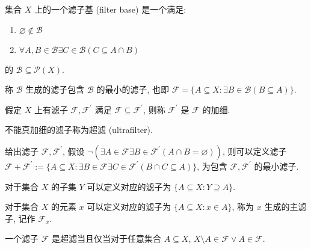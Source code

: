 \begin{definition}[滤子基]
    集合 \(X\) 上的一个滤子基 (filter base) 是一个满足:

    \begin{enumerate}
        \item \(\varnothing \notin \mathcal{B}\)
        \item \(\forall A,B \in \mathcal{B} \exists C \in \mathcal{B} (C \subseteq A \cap B)\)
    \end{enumerate}

    的 \(\mathcal{B} \subseteq \mathcal{P} (X)\).

    称 \(\mathcal{B}\) 生成的滤子包含 \(\mathcal{B}\) 的最小的滤子, 也即 \(\mathcal{F} = \{A \subseteq X : \exists B \in \mathcal{B} (B \subseteq A)\}\).
\end{definition}

\begin{definition}[加细]
    假定 \(X\) 上有滤子 \(\mathcal{F},\mathcal{F}^\prime\) 满足 \(\mathcal{F} \subseteq \mathcal{F}^\prime\), 则称 \(\mathcal{F}^\prime\) 是 \(\mathcal{F}\) 的加细. 
\end{definition}

\begin{definition}[超滤]
    不能真加细的滤子称为超滤 (ultrafilter).
\end{definition}

\begin{definition}
    给出滤子 \(\mathcal{F},\mathcal{F}^\prime\), 假设 \(\neg (\exists A \in \mathcal{F} \exists B \in \mathcal{F}^\prime (A \cap B = \varnothing))\),
    则可以定义滤子 \(\mathcal{F} + \mathcal{F}^\prime := \{A \subseteq X : \exists B \in \mathcal{F} \exists C \in \mathcal{F}^\prime (B \cap C \subseteq A)\}\),
    为包含 \(\mathcal{F},\mathcal{F}^\prime\) 的最小滤子.
\end{definition}

\begin{definition}
    对于集合 \(X\) 的子集 \(Y\) 可以定义对应的滤子为 \(\{A \subseteq X : Y \supseteq A\}\).
\end{definition}

\begin{definition}[主滤子]
    对于集合 \(X\) 的元素 \(x\) 可以定义对应的滤子为 \(\{A \subseteq X : x \in A\}\),
    称为 \(x\) 生成的主滤子, 记作 \(\mathcal{F}_x\).
\end{definition}

\begin{corollary}
    一个滤子 \(\mathcal{F}\) 是超滤当且仅当对于任意集合 \(A \subseteq X\), \(X \setminus A \in \mathcal{F} \lor A \in \mathcal{F}\).
\end{corollary}

